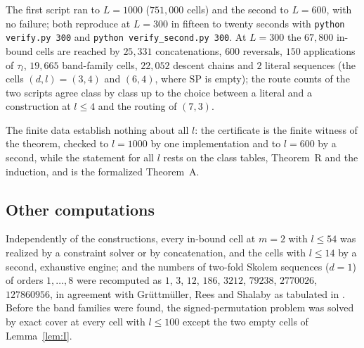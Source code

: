 \documentclass[11pt]{amsart}
\theoremstyle{plain}
\theoremstyle{definition}
\theoremstyle{remark}
\newcommand{\SP}{\mathrm{SP}}
\begin{document}
The first script ran to $L = 1000$ ($751{,}000$ cells) and the second to $L = 600$, with
no failure; both reproduce at $L = 300$ in fifteen to twenty seconds with
\texttt{python verify.py 300} and \texttt{python verify\_second.py 300}. At $L = 300$
the $67{,}800$ in-bound cells are reached by $25{,}331$ concatenations, $600$ reversals,
$150$ applications of $\tau_l$, $19{,}665$ band-family cells, $22{,}052$ descent chains
and $2$ literal sequences (the cells $(d,l) = (3,4)$ and $(6,4)$, where $\SP$ is empty);
the route counts of the two scripts agree class by class up to the choice between a
literal and a construction at $l \le 4$ and the routing of $(7,3)$.

The finite data establish nothing about all $l$: the certificate is the finite witness of
the theorem, checked to $l = 1000$ by one implementation and to $l = 600$ by a second,
while the statement for all $l$ rests on the class tables, Theorem~R and the induction,
and is the formalized Theorem~A.

\subsection*{Other computations}
Independently of the constructions, every in-bound cell at $m = 2$ with $l \le 54$ was
realized by a constraint solver or by concatenation, and the cells with $l \le 14$ by a
second, exhaustive engine; and the numbers of two-fold
Skolem sequences ($d = 1$) of orders $1,\dots,8$ were recomputed as $1$, $3$, $12$,
$186$, $3212$, $79238$, $2770026$, $127860956$, in agreement with Gr\"uttm\"uller, Rees
and Shalaby \cite{GRS} as tabulated in \cite{Alr}. Before the band families were found,
the signed-permutation problem was solved by exact cover at every cell with
$l \le 100$ except the two empty cells of Lemma~\ref{lem:I}.
\end{document}
